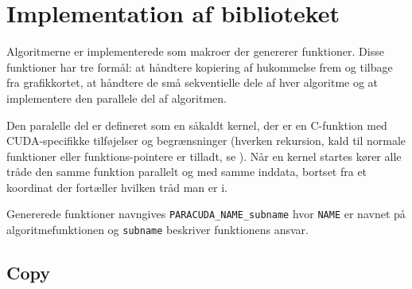 

\section{Implementation af biblioteket}
\label{paracuda-implementation}

Algoritmerne er implementerede som makroer der genererer funktioner.
Disse funktioner har tre formål: at håndtere kopiering af hukommelse
frem og tilbage fra grafikkortet, at håndtere de små sekventielle
dele af hver algoritme og at implementere den parallele del af 
algoritmen.

Den paralelle del er defineret som en såkaldt kernel, der er en 
C-funktion med CUDA-specifikke tilføjelser og begrænsninger 
(hverken rekursion, kald til normale funktioner eller 
funktions-pointere er tilladt, se \cite{cuda-guide}).
Når en kernel startes kører alle tråde den samme funktion parallelt og
med samme inddata, bortset fra et koordinat der fortæller hvilken
tråd man er i.

Genererede funktioner navngives \verb|PARACUDA_NAME_subname| hvor 
\verb|NAME| er navnet på algoritmefunktionen og \verb|subname| 
beskriver funktionens ansvar.

\subsection{Copy}

